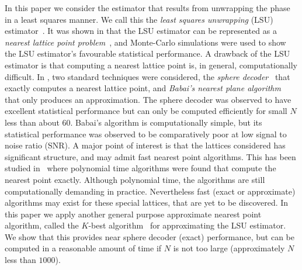\documentclass[journal]{IEEEtran}
\begin{document}
In this paper we consider the estimator that results from unwrapping the phase in a least squares manner.  We call this the \emph{least squares unwrapping} (LSU) estimator~\cite{McKilliam2009asilomar_polyest_lattice, McKilliamFrequencyEstimationByPhaseUnwrapping2009,McKilliam2010thesis}.  It was shown in \cite{McKilliam2009asilomar_polyest_lattice, McKilliamFrequencyEstimationByPhaseUnwrapping2009} that the LSU estimator can be represented as a \emph{nearest lattice point problem}~\cite{Agrell2002}, and Monte-Carlo simulations were used to show the LSU estimator's favourable statistical performance. %
A drawback of the LSU estimator is that computing a nearest lattice point is, in general, computationally difficult.  In \cite{McKilliam2009asilomar_polyest_lattice}, two standard techniques were considered, the \emph{sphere decoder}~\cite{Pohst_sphere_decoder_1981,Viterbo_sphere_decoder_1999,Agrell2002} that exactly computes a nearest lattice point, and \emph{Babai's nearest plane algorithm}~\cite{Babai1986} that only produces an approximation. The sphere decoder was observed to have excellent statistical performance but can only be computed efficiently for small $N$ less than about $60$.  Babai's algorithm is computationally simple, but its statistical performance was observed to be comparatively poor at low signal to noise ratio (SNR). A major point of interest is that the lattices considered has significant structure, and may admit fast nearest point algorithms.  This has been studied in~\cite{McKilliam2010thesis} where polynomial time algorithms were found that compute the nearest point exactly.  Although polynomial time, the algorithms are still computationally demanding in practice.  Nevertheless fast (exact or approximate) algorithms may exist for these special lattices, that are yet to be discovered.  In this paper we apply another general purpose approximate nearest point algorithm, called the $K$-best algorithm~\cite{Baro_list_sphere_dec_2003,Zhan2006_K_best_sphere_decoder,Mondal_Kbest_again_2009} for approximating the LSU estimator.  We show that this provides near sphere decoder (exact) performance, but can be computed in a reasonable amount of time if $N$ is not too large (approximately $N$ less than $1000$).  %
\end{document}
